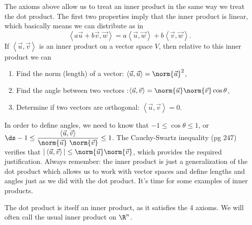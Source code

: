 The axioms above allow us to treat an inner product in the same way we treat the dot product.  The first two properties imply that the inner product is linear, which basically means we can distribute as in 
$$\left<a\vec u +b\vec v,\vec w\right> = a\left<\vec u,\vec w\right> +b\left<\vec v,\vec w\right>.$$  
If $\left<\vec u,\vec v\right>$ is an inner product on a vector space $V$, then relative to this inner product we can
\begin{enumerate}
	\item 
	Find the norm (length) of a vector: $\left<\vec u , \vec u\right>=\norm{\vec u }^2$,
	\item Find the angle between two vectors :$\left<\vec u , \vec v\right>= \norm{\vec u} \norm{\vec v}\cos \theta$,
	\item Determine if two vectors are orthogonal: $\left<\vec u , \vec v\right> = 0$.
\end{enumerate}
In order to define angles, we need to know that $-1\leq \cos\theta \leq 1$, or $\ds -1\leq \dfrac{\left<\vec u,\vec v\right>}{\norm{\vec u}\ \norm{\vec v}}\leq 1$.  The Cauchy-Swartz inequality (pg 247) verifies that $|\left<\vec u , \vec v\right>|\leq \norm{\vec u} \norm{\vec v}$, which provides the required justification. 
Always remember: the inner product is just a generalization of the dot product which allows us to work with vector spaces  and define lengths and angles just as we did with the dot product. It's time for some examples of inner products.

\begin{example}
The dot product is itself an inner product, as it satisfies the 4 axioms. We will often call the usual inner product on $\R^n$.
\end{example}


